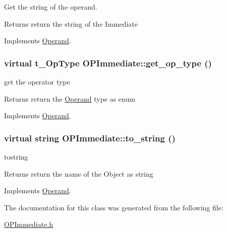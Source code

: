 Get the string of the operand. \begin{DoxyReturn}{Returns}
return the string of the Immediate 
\end{DoxyReturn}


Implements \hyperlink{classOperand_a2bf3ad8b34d39cb35ff743ffcc0f4675}{Operand}.\hypertarget{classOPImmediate_aed01353798ae57936a9f77dd05eafa88}{
\subsubsection[{get\_\-op\_\-type}]{\setlength{\rightskip}{0pt plus 5cm}virtual t\_\-OpType OPImmediate::get\_\-op\_\-type ()}}
\label{classOPImmediate_aed01353798ae57936a9f77dd05eafa88}


get the operator type \begin{DoxyReturn}{Returns}
return the \hyperlink{classOperand}{Operand} type as enum 
\end{DoxyReturn}


Implements \hyperlink{classOperand_afd469e305a467e2574f34ac9bd6c62b0}{Operand}.\hypertarget{classOPImmediate_a12bc613de3bff73ead8632dafd8050a0}{
\subsubsection[{to\_\-string}]{\setlength{\rightskip}{0pt plus 5cm}virtual string OPImmediate::to\_\-string ()}}
\label{classOPImmediate_a12bc613de3bff73ead8632dafd8050a0}


tostring \begin{DoxyReturn}{Returns}
return the name of the Object as string 
\end{DoxyReturn}


Implements \hyperlink{classOperand_a28aed96d5fafee66be81c30c1435ad00}{Operand}.

The documentation for this class was generated from the following file:\begin{DoxyCompactItemize}
\item 
\hyperlink{OPImmediate_8h}{OPImmediate.h}\end{DoxyCompactItemize}
